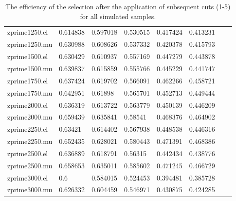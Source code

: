 \begin{table}[H]
\begin{tabular}{l|lllllll}
      zprime1250.el & 0.614838   & 0.597018   & 0.530515   & 0.417424    & 0.413231    \\
      zprime1250.mu & 0.630988   & 0.608626   & 0.537332   & 0.420378    & 0.415793    \\
      zprime1500.el & 0.630429   & 0.610937   & 0.557169   & 0.447279    & 0.443878    \\
      zprime1500.mu & 0.639837   & 0.615859   & 0.555766   & 0.445229    & 0.441747    \\
      zprime1750.el & 0.637424   & 0.619702   & 0.566091   & 0.462266    & 0.458721    \\
      zprime1750.mu & 0.642951   & 0.61898    & 0.565701   & 0.452713    & 0.449444    \\
      zprime2000.el & 0.636319   & 0.613722   & 0.563779   & 0.450139    & 0.446209    \\
      zprime2000.mu & 0.659439   & 0.635841   & 0.58541    & 0.468376    & 0.464902    \\
      zprime2250.el & 0.63421    & 0.614402   & 0.567938   & 0.448538    & 0.446316    \\
      zprime2250.mu & 0.652435   & 0.628021   & 0.580443   & 0.471391    & 0.468386    \\
      zprime2500.el & 0.636889   & 0.618791   & 0.56315    & 0.442434    & 0.438776    \\
      zprime2500.mu & 0.658653   & 0.635011   & 0.585602   & 0.471245    & 0.466729    \\
      zprime3000.el & 0.6        & 0.584015   & 0.524453   & 0.394481    & 0.385728    \\
      zprime3000.mu & 0.626332   & 0.604459   & 0.546971   & 0.430875    & 0.424285    
    \end{tabular}
    \caption{The efficiency of the selection after the application of subsequent cuts (1-5) for all simulated samples.}
    \label{tab:eff_a}

  \end{table}



